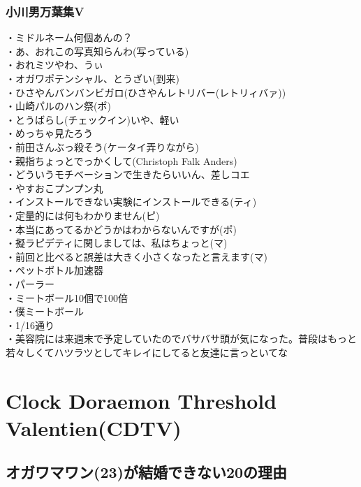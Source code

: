 \subsubsection{小川男万葉集V}
・ミドルネーム何個あんの？\\
・あ、おれこの写真知らんわ(写っている)\\
・おれミツやわ、うぃ\\
・オガワポテンシャル、とうざい(到来)\\
・ひさやんバンバンビガロ(ひさやんレトリバー(レトリィバァ))\\
・山崎パルのハン祭(ポ)\\
・とうばらし(チェックイン)いや、軽い\\
・めっちゃ見たろう\\
・前田さんぶっ殺そう(ケータイ弄りながら)\\
・親指ちょっとでっかくして(Christoph Falk Anders)\\
・どういうモチベーションで生きたらいいん、差しコエ\\
・やすおこプンプン丸\\
・インストールできない実験にインストールできる(ティ)\\
・定量的には何もわかりません(ピ)\\
・本当にあってるかどうかはわからないんですが(ポ)\\
・擬ラピデティに関しましては、私はちょっと(マ)\\
・前回と比べると誤差は大きく小さくなったと言えます(マ)\\
・ペットボトル加速器\\
・パーラー\\
・ミートボール10個で100倍\\
・僕ミートボール\\
・1/16通り\\
・美容院には来週末で予定していたのでバサバサ頭が気になった。普段はもっと若々しくてハツラツとしてキレイにしてると友達に言っといてな\\


\newpage
\section{Clock Doraemon Threshold Valentien(CDTV)}
\subsection{オガワマワン(23)が結婚できない20の理由}
